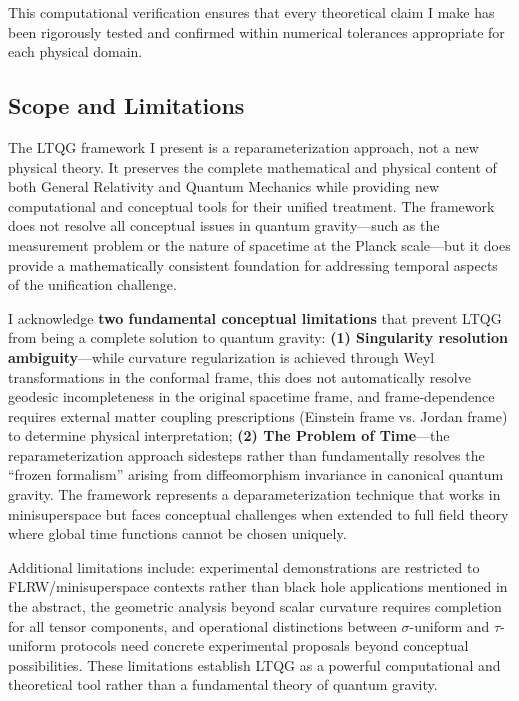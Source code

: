 This computational verification ensures that every theoretical claim I make has been rigorously tested and confirmed within numerical tolerances appropriate for each physical domain.

\subsection{Scope and Limitations}

The LTQG framework I present is a reparameterization approach, not a new physical theory. It preserves the complete mathematical and physical content of both General Relativity and Quantum Mechanics while providing new computational and conceptual tools for their unified treatment. The framework does not resolve all conceptual issues in quantum gravity—such as the measurement problem or the nature of spacetime at the Planck scale—but it does provide a mathematically consistent foundation for addressing temporal aspects of the unification challenge.

I acknowledge \textbf{two fundamental conceptual limitations} that prevent LTQG from being a complete solution to quantum gravity: \textbf{(1) Singularity resolution ambiguity}—while curvature regularization is achieved through Weyl transformations in the conformal frame, this does not automatically resolve geodesic incompleteness in the original spacetime frame, and frame-dependence requires external matter coupling prescriptions (Einstein frame vs. Jordan frame) to determine physical interpretation; \textbf{(2) The Problem of Time}—the reparameterization approach sidesteps rather than fundamentally resolves the ``frozen formalism'' arising from diffeomorphism invariance in canonical quantum gravity. The framework represents a deparameterization technique that works in minisuperspace but faces conceptual challenges when extended to full field theory where global time functions cannot be chosen uniquely.

Additional limitations include: experimental demonstrations are restricted to FLRW/minisuperspace contexts rather than black hole applications mentioned in the abstract, the geometric analysis beyond scalar curvature requires completion for all tensor components, and operational distinctions between $\sigma$-uniform and $\tau$-uniform protocols need concrete experimental proposals beyond conceptual possibilities. These limitations establish LTQG as a powerful computational and theoretical tool rather than a fundamental theory of quantum gravity.

